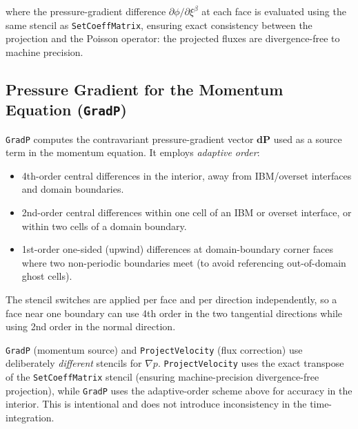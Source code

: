 \documentclass[12pt,a4paper]{article}
\begin{document}
where the pressure-gradient difference $\partial\phi/\partial\xi^\beta$
at each face is evaluated using the same stencil as
\texttt{SetCoeffMatrix}, ensuring exact consistency between the
projection and the Poisson operator: the projected fluxes are
divergence-free to machine precision.

\subsection{Pressure Gradient for the Momentum Equation (\texttt{GradP})}
\label{sec:peqn-gradp}

\texttt{GradP} computes the contravariant pressure-gradient vector
$\mathbf{dP}$ used as a source term in the momentum equation.  It
employs \emph{adaptive order}:

\begin{itemize}
  \item 4th-order central differences in the interior, away from
    IBM/overset interfaces and domain boundaries.
  \item 2nd-order central differences within one cell of an IBM or
    overset interface, or within two cells of a domain boundary.
  \item 1st-order one-sided (upwind) differences at domain-boundary
    corner faces where two non-periodic boundaries meet (to avoid
    referencing out-of-domain ghost cells).
\end{itemize}

The stencil switches are applied per face and per direction
independently, so a face near one boundary can use 4th order
in the two tangential directions while using 2nd order in the
normal direction.

\begin{notebox}
  \texttt{GradP} (momentum source) and \texttt{ProjectVelocity}
  (flux correction) use deliberately \emph{different} stencils for
  $\nabla p$.  \texttt{ProjectVelocity} uses the exact transpose of
  the \texttt{SetCoeffMatrix} stencil (ensuring machine-precision
  divergence-free projection), while \texttt{GradP} uses the
  adaptive-order scheme above for accuracy in the interior.  This
  is intentional and does not introduce inconsistency in the
  time-integration.
\end{notebox}


\clearpage
\end{document}
